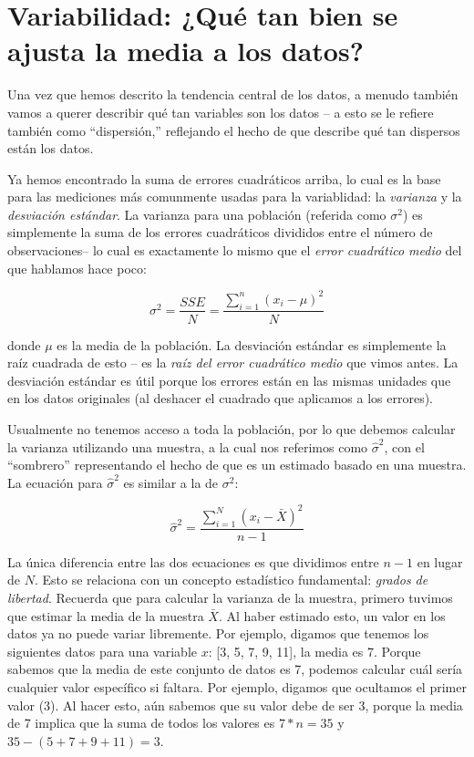 \documentclass[
  12pt,
]{book}
\theoremstyle{definition}
\theoremstyle{definition}
\theoremstyle{definition}
\theoremstyle{remark}
\begin{document}
\hypertarget{variabilidad-quuxe9-tan-bien-se-ajusta-la-media-a-los-datos}{%
\section{Variabilidad: ¿Qué tan bien se ajusta la media a los datos?}\label{variabilidad-quuxe9-tan-bien-se-ajusta-la-media-a-los-datos}}

Una vez que hemos descrito la tendencia central de los datos, a menudo también vamos a querer describir qué tan variables son los datos -- a esto se le refiere también como ``dispersión,'' reflejando el hecho de que describe qué tan dispersos están los datos.

Ya hemos encontrado la suma de errores cuadráticos arriba, lo cual es la base para las mediciones más comunmente usadas para la variablidad: la \emph{varianza} y la \emph{desviación estándar}. La varianza para una población (referida como \(\sigma^2\)) es simplemente la suma de los errores cuadráticos divididos entre el número de observaciones-- lo cual es exactamente lo mismo que el \emph{error cuadrático medio} del que hablamos hace poco:

\[
\sigma^2 = \frac{SSE}{N} = \frac{\sum_{i=1}^n (x_i - \mu)^2}{N}
\]

donde \(\mu\) es la media de la población. La desviación estándar es simplemente la raíz cuadrada de esto -- es la \emph{raíz del error cuadrático medio} que vimos antes. La desviación estándar es útil porque los errores están en las mismas unidades que en los datos originales (al deshacer el cuadrado que aplicamos a los errores).

Usualmente no tenemos acceso a toda la población, por lo que debemos calcular la varianza utilizando una muestra, a la cual nos referimos como \(\hat{\sigma}^2\), con el ``sombrero'' representando el hecho de que es un estimado basado en una muestra. La ecuación para \(\hat{\sigma}^2\) es similar a la de \(\sigma^2\):

\[
\hat{\sigma}^2 = \frac{\sum_{i=1}^N (x_i - \bar{X})^2}{n-1}
\]

La única diferencia entre las dos ecuaciones es que dividimos entre \(n - 1\) en lugar de \(N\). Esto se relaciona con un concepto estadístico fundamental: \emph{grados de libertad}. Recuerda que para calcular la varianza de la muestra, primero tuvimos que estimar la media de la muestra \(\bar{X}\). Al haber estimado esto, un valor en los datos ya no puede variar libremente. Por ejemplo, digamos que tenemos los siguientes datos para una variable \(x\): {[}3, 5, 7, 9, 11{]}, la media es 7. Porque sabemos que la media de este conjunto de datos es 7, podemos calcular cuál sería cualquier valor específico si faltara. Por ejemplo, digamos que ocultamos el primer valor (3). Al hacer esto, aún sabemos que su valor debe de ser 3, porque la media de 7 implica que la suma de todos los valores es \(7 * n = 35\) y \(35 - (5 + 7 + 9 + 11) = 3\).
\end{document}
